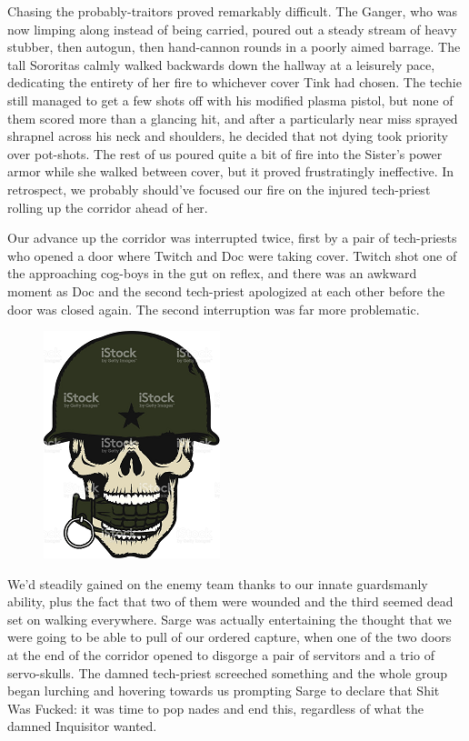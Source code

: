 Chasing the probably-traitors proved remarkably difficult. 
The Ganger, who was now limping along instead of being carried, poured out a steady stream of heavy stubber, then autogun, then hand-cannon rounds in a poorly aimed barrage. 
The tall Sororitas calmly walked backwards down the hallway at a leisurely pace, dedicating the entirety of her fire to whichever cover Tink had chosen. 
The techie still managed to get a few shots off with his modified plasma pistol, but none of them scored more than a glancing hit, and after a particularly near miss sprayed shrapnel across his neck and shoulders, he decided that not dying took priority over pot-shots. 
The rest of us poured quite a bit of fire into the Sister's power armor while she walked between cover, but it proved frustratingly ineffective. 
In retrospect, we probably should've focused our fire on the injured tech-priest rolling up the corridor ahead of her.

Our advance up the corridor was interrupted twice, first by a pair of tech-priests who opened a door where Twitch and Doc were taking cover. 
Twitch shot one of the approaching cog-boys in the gut on reflex, and there was an awkward moment as Doc and the second tech-priest apologized at each other before the door was closed again. 
The second interruption was far more problematic. 


\begin{figure}
	\begin{center}
		\includegraphics[width=\figwidth]{pics/18/17.png}
	\end{center}
\end{figure}
We'd steadily gained on the enemy team thanks to our innate guardsmanly ability, plus the fact that two of them were wounded and the third seemed dead set on walking everywhere. 
Sarge was actually entertaining the thought that we were going to be able to pull of our ordered capture, when one of the two doors at the end of the corridor opened to disgorge a pair of servitors and a trio of servo-skulls. 
The damned tech-priest screeched something and the whole group began lurching and hovering towards us prompting Sarge to declare that Shit Was Fucked: 
it was time to pop nades and end this, regardless of what the damned Inquisitor wanted.

